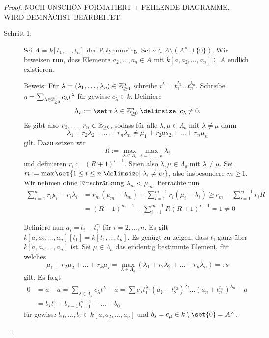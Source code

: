 \documentclass[12pt,a4paper]{scrartcl}
\theoremstyle{cplain}
\theoremstyle{cdef}
\begin{document}
\begin{proof} NOCH UNSCHÖN FORMATIERT + FEHLENDE DIAGRAMME, WIRD DEMNÄCHST BEARBEITET %
	\leavevmode
	\begin{description}
		\item[Schritt 1:] Sei $A = k[t_1,\dots, t_n]$ der Polynomring. Sei $a\in A\setminus(A^{\times}\cup \{0\})$. Wir beweisen nun, dass Elemente $a_2,\dots, a_n\in A$ mit $k[a, a_2,\dots, a_n]\subseteq A$ endlich existieren.
		
		Beweis: Für $\lambda = (\lambda_1,\dots, \lambda_n)\in\mathbb Z_{\ge 0}^n$ schreibe $t^{\lambda} = t_1^{\lambda_1}\dots t_n^{\lambda_n}$. Schreibe $a = \sum_{\lambda\in\mathbb Z_{\ge 0}^n} c_{\lambda}t^{\lambda}$ für gewisse $c_{\lambda}\in k$. Definiere
		\[\Lambda_a := \set*{\lambda\in\IZ_{\ge 0}^n \given c_{\lambda}\neq 0}.\]
		Es gibt also $r_2,\dots, r_n\in\mathbb Z_{\ge 0}$, sodass für alle $\lambda, \mu\in \Lambda_a$ mit $\lambda\neq \mu$ dann
		\[\lambda_1+r_2\lambda_2+\dots +r_n\lambda_n\neq \mu_1+r_2\mu s_2+\dots + r_n\mu_n\]
		gilt. Dazu setzen wir \[R := \max\limits_{\lambda\in\Lambda_a}\max_{i = 1,\dots, n}\lambda _i\] und definieren $r_i := (R+1)^{i-1}$. Seien also $\lambda,\mu \in \Lambda_a$ mit $\lambda\neq\mu$. Sei $m := \max\set{1\le i \le n \given \lambda_i \neq \mu_i}$, also insbesondere $m\ge 1$. Wir nehmen ohne Einschränkung $\lambda_m < \mu_m$. Betrachte nun \begin{align*}
			\sum_{i = 1}^nr_i\mu_i-r_i\lambda_i &= r_m(\mu_m-\lambda_m)+\sum_{i = 1}^{m-1}r_i(\mu_i-\lambda_i)\ge r_m-\sum_{i = 1}^{m-1}r_iR \\ &= (R+1)^{m-1}-\sum_{i = 1}^{m-1} R(R+1)^{i-1} = 1\neq 0
		\end{align*}
		
		Definiere nun $a_i = t_i-t_i^{r_i}$ für $i = 2, \dots, n$. Es gilt $k[a,a_2,\dots, a_n][t_1] = k[t_1,\dots, t_n]$. Es genügt zu zeigen, dass $t_1$ ganz über $k[a,a_2,\dots, a_n]$ ist. Sei $\mu\in\Lambda_a$ das eindeutig bestimmte Element, für welches
		\[\mu_1+r_2\mu_2+\dots+r_k\mu_k = \max\limits_{\lambda\in\Lambda_a}(\lambda_1+r_2\lambda_2+\dots+r_n\lambda_n) =: s\] gilt.
		Es folgt \begin{align*}
			0 &= a-a = \sum_{\lambda\in\Lambda_a}c_{\lambda}t^{\lambda}-a = \sum c_{\lambda}t_1^{\lambda_1}(a_2+t_2^{r_2})^{\lambda_2}\dots (a_n+t_n^{r_n})^{\lambda_n} -a \\ &= b_st_i^s+b_{s-1}t_{i-1}^{s-1}+\dots +b_0
		\end{align*}
		für gewisse $b_0,\dots, b_s\in k[a, a_2,\dots, a_n]$ und $b_s = c_{\mu} \in k\setminus \set{0} = A^{\times}$.
		

\end{description}
\end{proof}
\end{document}
